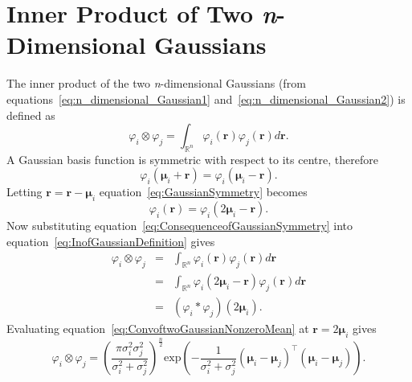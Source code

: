 \documentclass[]{article}
\begin{document}
\section*{Inner Product of Two \emph{n}-Dimensional Gaussians}\label{ap:InnerProdOfGaussians}
The inner product of the two \emph{n}-dimensional Gaussians (from equations~\ref{eq:n_dimensional_Gaussian1} and~\ref{eq:n_dimensional_Gaussian2}) is defined as
\begin{equation}\label{eq:InofGaussianDefinition}
\varphi_i\otimes\varphi_j=\int_{\mathbb{R}^n}\varphi_i(\mathbf r)\varphi_j(\mathbf r)d\mathbf{r}.
\end{equation}
A Gaussian basis function is symmetric with respect to its centre, therefore
\begin{equation}\label{eq:GaussianSymmetry}
 \varphi_i(\boldsymbol \mu_i+\mathbf r)= \varphi_i(\boldsymbol \mu_i-\mathbf r).
\end{equation}
Letting $\mathbf{r}= \mathbf{r}-\boldsymbol{\mu}_i$ equation~\ref{eq:GaussianSymmetry} becomes
\begin{equation}\label{eq:ConsequenceofGaussianSymmetry}
 \varphi_i(\mathbf r)= \varphi_i(2\boldsymbol \mu_i-\mathbf r).
\end{equation}
Now substituting equation~\ref{eq:ConsequenceofGaussianSymmetry} into equation~\ref{eq:InofGaussianDefinition} gives 
\begin{eqnarray}
\varphi_i\otimes\varphi_j&=&\int_{\mathbb{R}^n}\varphi_i(\mathbf r)\varphi_j(\mathbf r)d\mathbf r\\
&=&\int_{\mathbb{R}^n}\varphi_i(2\boldsymbol \mu_i-\mathbf r)\varphi_j(\mathbf r)d\mathbf r\\
&=&(\varphi_i*\varphi_j)(2\boldsymbol \mu_i).
\end{eqnarray}
Evaluating equation~\ref{eq:ConvoftwoGaussianNonzeroMean} at $\mathbf r=2\boldsymbol\mu_i $ gives
\begin{equation}
 \varphi_i\otimes\varphi_j=\left(\frac{\pi\sigma_i^2\sigma_j^2}{\sigma_i^2+\sigma_j^2}\right)^{\frac{n}{2}}\mathrm{exp}\left({-\frac{1}{\sigma_i^2+\sigma_j^2} (\boldsymbol\mu_i-\boldsymbol\mu_j)^\top(\boldsymbol\mu_i-\boldsymbol\mu_j)}\right).
\end{equation}



\end{document}

